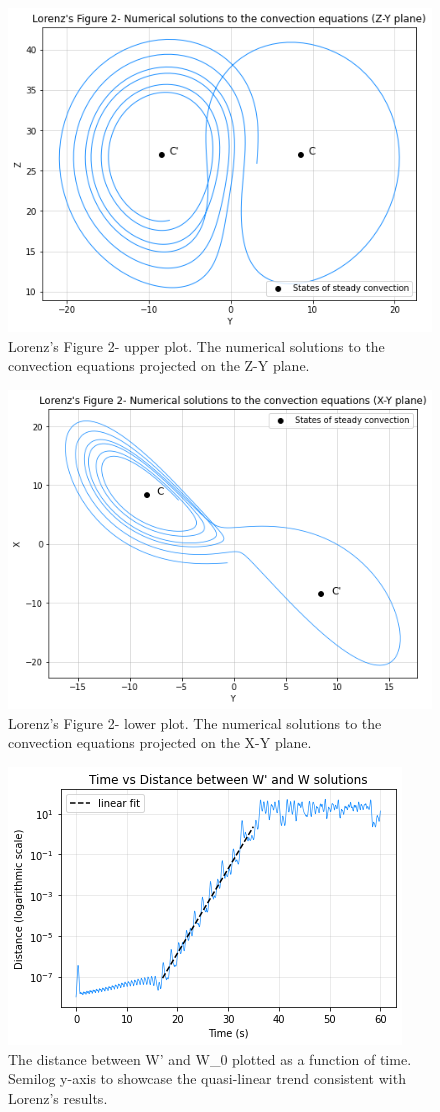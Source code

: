 \documentclass{article}
\begin{document}
\begin{figure}[htbp]
\centerline{\includegraphics[scale=.6]{A3_q2_2_1.png}}
\caption{Lorenz's Figure 2- upper plot. The numerical solutions to the convection equations projected on the Z-Y plane.}
\label{fig}
\end{figure}

\begin{figure}[htbp]
\centerline{\includegraphics[scale=.6]{A3_q2_3_1.png}}
\caption{Lorenz's Figure 2- lower plot. The numerical solutions to the convection equations projected on the X-Y plane.}
\label{fig}
\end{figure}

\begin{figure}[htbp]
\centerline{\includegraphics[scale=.8]{A3_q2_4_1.png}}
\caption{The distance between W' and W\_0 plotted as a function of time. Semilog y-axis to showcase the quasi-linear trend consistent with Lorenz's results.}
\label{fig}
\end{figure}
\end{document}
